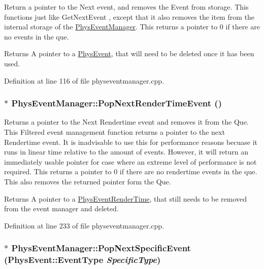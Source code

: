Return a pointer to the Next event, and removes the Event from storage. This functions just like GetNextEvent , except that it also removes the item from the internal storage of the \hyperlink{classPhysEventManager}{PhysEventManager}. This returns a pointer to 0 if there are no events in the que. \begin{DoxyReturn}{Returns}
A pointer to a \hyperlink{classPhysEvent}{PhysEvent}, that will need to be deleted once it has been used. 
\end{DoxyReturn}


Definition at line 116 of file physeventmanager.cpp.\hypertarget{classPhysEventManager_ad627925363fdbcff98e0faef204e81e2}{
\subsubsection[{PopNextRenderTimeEvent}]{ $\ast$ PhysEventManager::PopNextRenderTimeEvent ()}}
\label{d5/dd7/classPhysEventManager_ad627925363fdbcff98e0faef204e81e2}


Returns a pointer to the Next Rendertime event and removes it from the Que. This Filtered event management function returns a pointer to the next Rendertime event. It is inadvisable to use this for performance reasons becuase it runs in linear time relative to the amount of events. However, it will return an immediately usable pointer for case where an extreme level of performance is not required. This returns a pointer to 0 if there are no rendertime events in the que. This also removes the returned pointer form the Que. \begin{DoxyReturn}{Returns}
A pointer to a \hyperlink{classPhysEventRenderTime}{PhysEventRenderTime}, that still needs to be removed from the event manager and deleted. 
\end{DoxyReturn}


Definition at line 233 of file physeventmanager.cpp.\hypertarget{classPhysEventManager_abce156f7ad7ab145b8b05740b48e6073}{
\subsubsection[{PopNextSpecificEvent}]{ $\ast$ PhysEventManager::PopNextSpecificEvent (PhysEvent::EventType {\em SpecificType})}}
\label{d5/dd7/classPhysEventManager_abce156f7ad7ab145b8b05740b48e6073}


